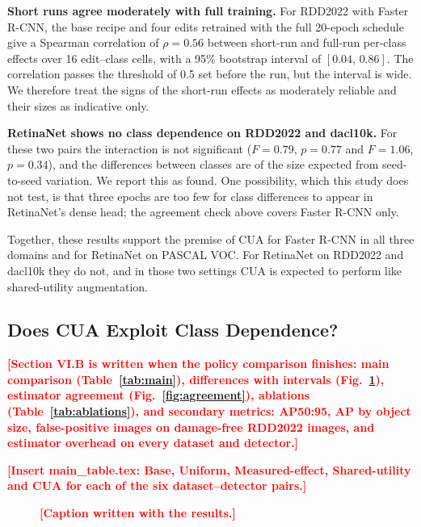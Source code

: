 \documentclass[conference]{IEEEtran}
\newcommand{\todo}[1]{\textcolor{red}{\textbf{[#1]}}}
\begin{document}
\noindent\textbf{Short runs agree moderately with full training.} For RDD2022 with Faster R-CNN, the base recipe and four edits retrained with the full 20-epoch schedule give a Spearman correlation of $\rho=0.56$ between short-run and full-run per-class effects over 16 edit--class cells, with a 95\% bootstrap interval of $[0.04,\,0.86]$. The correlation passes the threshold of 0.5 set before the run, but the interval is wide. We therefore treat the signs of the short-run effects as moderately reliable and their sizes as indicative only.

\noindent\textbf{RetinaNet shows no class dependence on RDD2022 and dacl10k.} For these two pairs the interaction is not significant ($F=0.79$, $p=0.77$ and $F=1.06$, $p=0.34$), and the differences between classes are of the size expected from seed-to-seed variation. We report this as found. One possibility, which this study does not test, is that three epochs are too few for class differences to appear in RetinaNet's dense head; the agreement check above covers Faster R-CNN only.

Together, these results support the premise of CUA for Faster R-CNN in all three domains and for RetinaNet on PASCAL VOC. For RetinaNet on RDD2022 and dacl10k they do not, and in those two settings CUA is expected to perform like shared-utility augmentation.

\subsection{Does CUA Exploit Class Dependence?}
\label{sec:results_comparison}

\todo{Section VI.B is written when the policy comparison finishes: main comparison (Table~\ref{tab:main}), differences with intervals (Fig.~\ref{fig:forest}), estimator agreement (Fig.~\ref{fig:agreement}), ablations (Table~\ref{tab:ablations}), and secondary metrics: AP50:95, AP by object size, false-positive images on damage-free RDD2022 images, and estimator overhead on every dataset and detector.}

\begin{table}[t]
\caption{Test Macro AP50 of the Compared Policies (Mean $\pm$ s.d.\ over Three Seeds)}
\label{tab:main}
\centering
\footnotesize
\todo{Insert main\_table.tex: Base, Uniform, Measured-effect, Shared-utility and CUA for each of the six dataset--detector pairs.}
\end{table}

\begin{figure}[t]
\centering
{}
\caption{\todo{Caption written with the results.}}
\label{fig:forest}
\end{figure}
\end{document}
